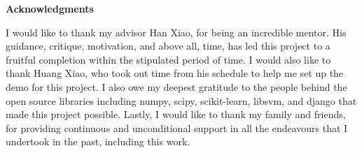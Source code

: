 \clearemptydoublepage
{}
{}	


\vspace*{2cm}

\begin{center}
{\Large \bf Acknowledgments}
\end{center}

\vspace{1cm}

I would like to thank my advisor Han Xiao, for being an incredible mentor. His guidance, critique, motivation, and above all, time, has led this project to a fruitful completion within the stipulated period of time. I would also like to thank Huang Xiao, who took out time from his schedule to help me set up the demo for this project. I also owe my deepest gratitude to the people behind the open source libraries including numpy, scipy, scikit-learn, libsvm, and django that made this project possible. Lastly, I would like to thank my family and friends, for providing continuous and unconditional support in all the endeavours that I undertook in the past, including this work.
